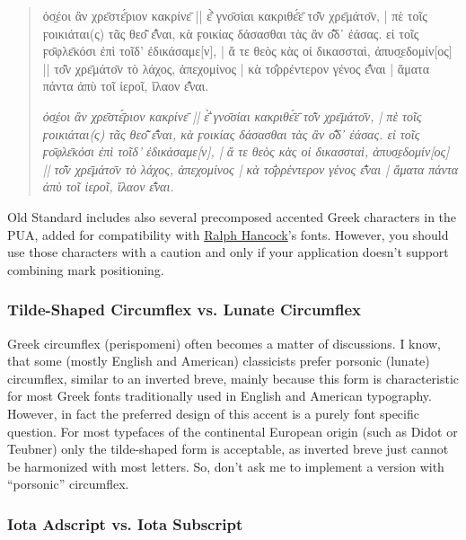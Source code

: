 \documentclass[12pt,a4paper,openany]{book}
\begin{document}
\begin{quote}
\large

ὀσ̱έοι ἂν χρε̄στε̄́ριον κακρίνε̄ || ε̄̓̀ γνο̄σίαι κακριθε̄́ε̄ το̄͂ν χρε̄μάτο̄ν, | πὲ τοῖς
ϝοικιάται(ς) τᾶς θεο̄͂ ε̄̓͂ναι, κὰ ϝοικίας δάσασθαι τὰς ἂν ο̄̓͂δ᾽ ἐάσας. εἰ τοῖς
ϝο̄φλε̄κόσι ἐπὶ τοῖδ’ ἐδικάσαμε[ν], | ἄ τε θεὸς κὰς οἰ δικασσταὶ,
ἀπυσ̱εδομίν[ος] || το̄͂ν χρε̄μάτο̄ν τὸ λάχος, ἀπεχομίνος | κὰ το̄̓ρρέντερον γένος
ε̄̓͂ναι | ἄματα πάντα ἀπὺ τοῖ ἰεροῖ, ἴλαον ε̄̓͂ναι.

\smallskip

\itshape
ὀσ̱έοι ἂν χρε̄στε̄́ριον κακρίνε̄ || ε̄̓̀ γνο̄σίαι κακριθε̄́ε̄ το̄͂ν χρε̄μάτο̄ν, | πὲ τοῖς
ϝοικιάται(ς) τᾶς θεο̄͂ ε̄̓͂ναι, κὰ ϝοικίας δάσασθαι τὰς ἂν ο̄̓͂δ᾽ ἐάσας. εἰ τοῖς
ϝο̄φλε̄κόσι ἐπὶ τοῖδ’ ἐδικάσαμε[ν], | ἄ τε θεὸς κὰς οἰ δικασσταὶ,
ἀπυσ̱εδομίν[ος] || το̄͂ν χρε̄μάτο̄ν τὸ λάχος, ἀπεχομίνος | κὰ το̄̓ρρέντερον γένος
ε̄̓͂ναι | ἄματα πάντα ἀπὺ τοῖ ἰεροῖ, ἴλαον ε̄̓͂ναι.

\end{quote}

Old Standard includes also several precomposed accented Greek characters in
the PUA, added for compatibility with
\href{http://www.users.dircon.co.uk/~hancock/index.htm}{Ralph Hancock}’s
fonts. However, you should use those characters with a caution and only if
your application doesn’t support combining mark positioning.

\subsubsection{Tilde-Shaped Circumflex vs. Lunate Circumflex}

Greek circumflex (perispomeni) often becomes a matter of discussions. I
know, that some (mostly English and American) classicists prefer porsonic
(lunate) circumflex, similar to an inverted breve, mainly because this form is
characteristic for most Greek fonts traditionally used in English and
American typography. However, in fact the preferred design of this accent
is a purely font specific question. For most typefaces of the continental
European origin (such as Didot or Teubner) only the tilde-shaped form is
acceptable, as inverted breve just cannot be harmonized with most letters.
So, don’t ask me to implement a version with “porsonic” circumflex.

\subsubsection{Iota Adscript vs. Iota Subscript}
\hypertarget{isub}{}\label{isub}
\end{document}
